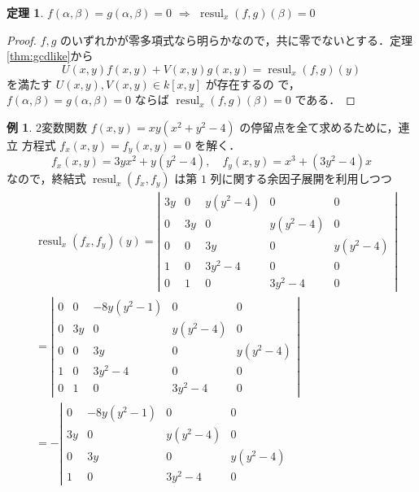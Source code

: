 \documentclass[12pt, uplatex, dvipdfmx]{jsarticle}
\theoremstyle{definition}
\newtheorem{theorem}{定理}
\newtheorem{example}{例}
\DeclareMathOperator{\resul}{resul}
\begin{document}
\begin{theorem}\label{thm:elimination}
  $f(\alpha,\beta)=g(\alpha,\beta)=0$ $\Longrightarrow$ $\resul_x(f,g)(\beta)=0$
\end{theorem}

\begin{proof}
  $f,g$ のいずれかが零多項式なら明らかなので，共に零でないとする．定理\ref{thm:gcdlike}から
  \[
    U(x,y) f(x,y) + V(x,y) g(x,y) = \resul_x(f,g)(y)
  \]
  を満たす $U(x,y), V(x,y) \in k[x,y]$ が存在するの
  で，$f(\alpha,\beta)=g(\alpha,\beta)=0$ ならば
  $\resul_x(f,g)(\beta)=0$ である．
\end{proof}


\newpage


\begin{example}
  2変数関数 $f(x,y) = x y (x^2+y^2-4)$ の停留点を全て求めるために，連立
  方程式 $f_x(x,y)=f_y(x,y)=0$ を解く．
  \[
    f_x(x,y)= 3y x^2 + y(y^2-4), \quad f_y(x,y)=x^3+(3y^2-4)x
  \]
  なので，終結式 $\resul_x(f_x, f_y)$ は第 $1$ 列に関する余因子展開を利用しつつ
  \[
    \begin{aligned}
     &\resul_x(f_x, f_y)(y) = \left|
        \begin{array}{ccccc}
          3y & 0 & y(y^2-4) & 0 & 0\\
          0 & 3y & 0 & y(y^2-4) & 0\\
          0 & 0 & 3y & 0 & y(y^2-4)\\
          1 & 0 & 3y^2-4 & 0 & 0\\
          0 & 1 & 0 & 3y^2-4 & 0
        \end{array}
      \right|\\
      & =  \left|
        \begin{array}{ccccc}
          0 & 0 & -8y(y^2-1) & 0 & 0 \\
          0 & 3y & 0 & y(y^2-4) & 0\\
          0 & 0 & 3y & 0 & y(y^2-4)\\
          1 & 0 & 3y^2-4 & 0 & 0\\
          0 & 1 & 0 & 3y^2-4 & 0
        \end{array}
      \right| \\ 
      & =  - \left|
        \begin{array}{cccc}
          0 & -8y(y^2-1) & 0 & 0\\
          3y & 0 & y(y^2-4) & 0\\
          0 & 3y & 0 & y(y^2-4)\\
          1 & 0 & 3y^2-4 & 0
        \end{array}

\end{aligned}\]
\end{example}
\end{document}
